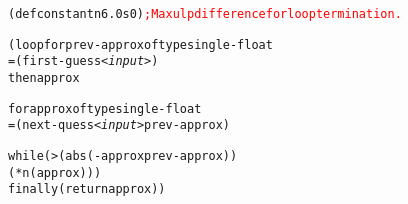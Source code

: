 \documentclass[../Example-Program.tex]{subfiles}
\begin{document}
\begin{alltt}
   (defconstant n 6.0s0) \textcolor{red}{; Max ulp difference for loop termination.}

   (loop for prev-approx of type single-float
         = (first-guess <\textit{input}>)
         then approx

         for approx of type single-float
         = (next-quess <\textit{input}> prev-approx)

         while (> (abs (- approx prev-approx))
                  (* n ( approx)))
         finally (return approx))
\end{alltt}
\end{document}
